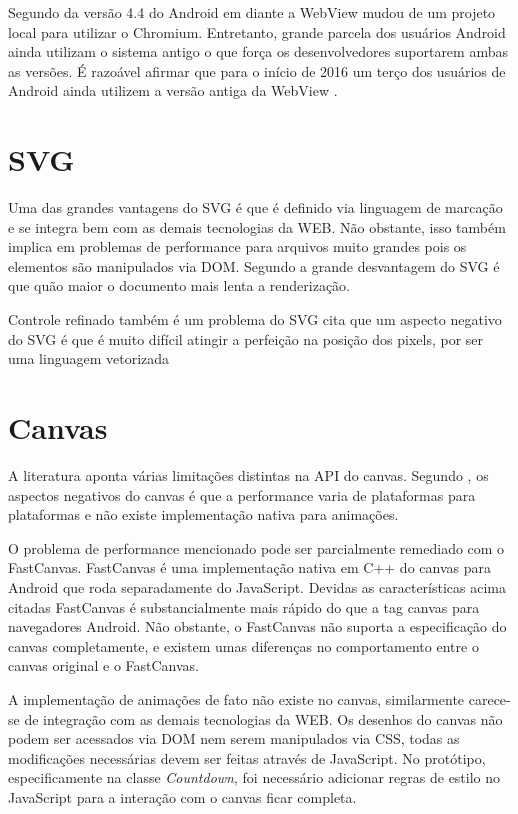 Segundo \cite{chromeWebView} da versão 4.4 do Android em diante a
WebView mudou de um projeto local para utilizar o Chromium. Entretanto,
grande parcela dos usuários Android ainda utilizam o sistema antigo o
que força os desenvolvedores suportarem ambas as versões. É razoável
afirmar que para o início de 2016 um terço dos usuários de Android
ainda utilizem a versão antiga da WebView \cite{chromeWebView}.


\section{SVG}

Uma das grandes vantagens do SVG é que é definido via linguagem de
marcação e se integra bem com as demais tecnologias da WEB. Não
obstante, isso também implica em problemas de performance para arquivos
muito grandes pois os elementos são manipulados via DOM. Segundo
\cite{html5mostwanted} a grande desvantagem do SVG é que quão maior o
documento mais lenta a renderização.

Controle refinado também é um problema do SVG \cite{html5mostwanted}
cita que um aspecto negativo do SVG é que é muito difícil atingir a
perfeição na posição dos pixels, por ser uma linguagem vetorizada

\section{Canvas}

A literatura aponta várias limitações distintas na API do canvas.
Segundo \autocite{html5mostwanted}, os aspectos negativos do canvas é
que a performance varia de plataformas para plataformas e não existe
implementação nativa para animações.

O problema de performance mencionado pode ser parcialmente remediado
com o FastCanvas. FastCanvas é uma implementação nativa em C++ do
canvas para Android que roda separadamente do JavaScript. Devidas as
características acima citadas FastCanvas é substancialmente mais
rápido do que a tag canvas para navegadores Android. Não obstante, o
FastCanvas não suporta a especificação do canvas completamente, e
existem umas diferenças no comportamento entre o canvas original e o
FastCanvas.

A implementação de animações de fato não existe no canvas,
similarmente carece-se de integração com as demais tecnologias
da WEB. Os desenhos do canvas não podem ser acessados via DOM nem
serem manipulados via CSS, todas as modificações necessárias devem
ser feitas através de JavaScript.
No protótipo, especificamente na classe \textit{Countdown}, foi necessário
adicionar regras de estilo no JavaScript para a interação com o canvas
ficar completa.

